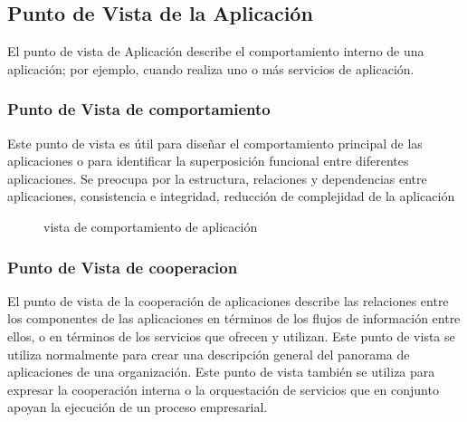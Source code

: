 \subsection{Punto de Vista de la Aplicación}
El punto de vista de Aplicación describe el comportamiento interno de una aplicación; por ejemplo, cuando realiza uno o más servicios de aplicación.

\subsubsection{Punto de Vista de comportamiento}
Este punto de vista es útil para diseñar el comportamiento principal de las aplicaciones o para identificar la superposición funcional entre diferentes aplicaciones. Se preocupa por la estructura, relaciones y dependencias entre aplicaciones, consistencia e integridad, reducción de complejidad de la aplicación
\begin{figure}[th!]
	\centering
	\caption{vista de comportamiento de aplicación}
	\label{fig:vistaaplicacion}
\end{figure}

\subsubsection{Punto de Vista de cooperacion}
El punto de vista de la cooperación de aplicaciones describe las relaciones entre los componentes de las aplicaciones en términos de los flujos de información entre ellos, o en términos de los servicios que ofrecen y utilizan. Este punto de vista se utiliza normalmente para crear una descripción general del panorama de aplicaciones de una organización. Este punto de vista también se utiliza para expresar la cooperación interna o la orquestación de servicios que en conjunto apoyan la ejecución de un proceso empresarial.


